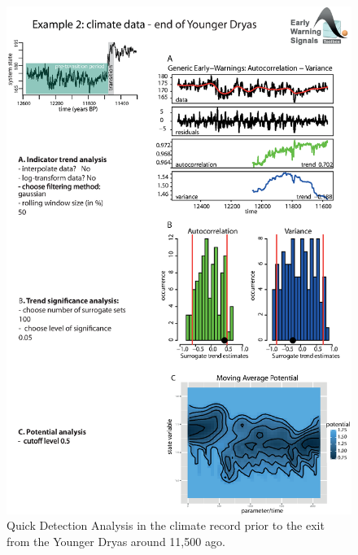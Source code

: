 \documentclass[12pt,a4paper,final]{article}
\begin{document}
\begin{figure}[h]
\begin{center}
\includegraphics[scale=0.8]{fig_3_climatedata.eps}
\caption{Quick Detection Analysis in the climate record prior to the exit from the Younger Dryas around 11,500 ago.}
\end{center}
\label{fig:QDA_climate}
\end{figure}
\end{document}
